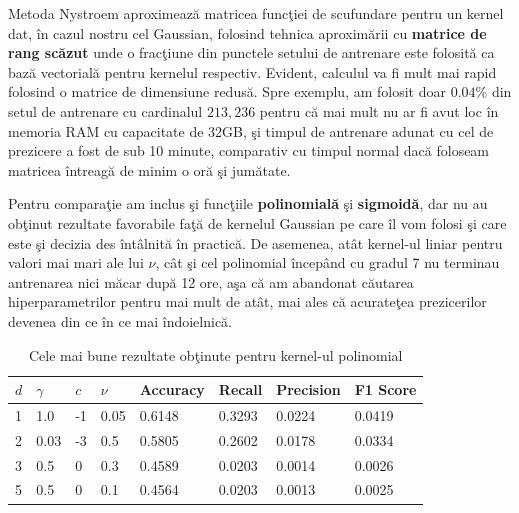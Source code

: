 Metoda Nystroem aproximează matricea funcţiei de scufundare pentru un kernel dat,
în cazul nostru cel Gaussian, folosind tehnica aproximării cu \textbf{matrice de 
rang scăzut} unde o fracţiune din punctele setului de antrenare este folosită 
ca bază vectorială pentru kernelul respectiv. Evident, calculul va fi mult mai 
rapid folosind o matrice de dimensiune redusă. Spre exemplu, am folosit doar 
\textbf{$0.04\%$} din setul de antrenare cu cardinalul $213,236$ pentru că mai mult nu 
ar fi avut loc în memoria
RAM cu capacitate de 32GB, şi timpul de antrenare adunat cu cel de prezicere a 
fost de sub 10 minute,
comparativ cu timpul normal dacă foloseam matricea întreagă de minim o oră şi 
jumătate.

Pentru comparaţie am inclus şi funcţiile \textbf{polinomială} şi 
\textbf{sigmoidă}, dar nu au obţinut
rezultate favorabile faţă de kernelul Gaussian pe care îl vom folosi şi care 
este şi decizia des întâlnită în practică. De asemenea, atât kernel-ul liniar pentru valori mai mari
ale lui $\nu$, 
cât şi cel polinomial începând cu gradul 7 nu terminau antrenarea nici măcar 
după 12 ore, aşa că am abandonat căutarea hiperparametrilor pentru mai mult 
de atât, mai ales că acurateţea prezicerilor devenea din ce în ce mai îndoielnică.

\begin{table}[H]
    \centering
    \begin{tabularx}{\textwidth}{
        |X
        |X
        |X
        |X
        |X
        |X
        |X
        |X|
    }
    \hline
    $d$ & $\gamma$ & $c$ & $\nu$ & {Accuracy} & {Recall} & {Precision} & {F1 Score} \\
    \hline
    \rowcolor{gray!20} 1 & 1.0 & -1 & 0.05 & 0.6148 & 0.3293 & 0.0224 & 0.0419 \\
    2 & 0.03 & -3 & 0.5 & 0.5805 & 0.2602 & 0.0178 & 0.0334 \\
    \rowcolor{gray!20} 3 & 0.5 & 0 & 0.3 & 0.4589 & 0.0203 & 0.0014 & 0.0026 \\
    5 & 0.5 & 0 & 0.1 & 0.4564 & 0.0203 & 0.0013 & 0.0025 \\
    \hline
  \end{tabularx}
  \caption{Cele mai bune rezultate obţinute pentru kernel-ul polinomial}
\end{table}

